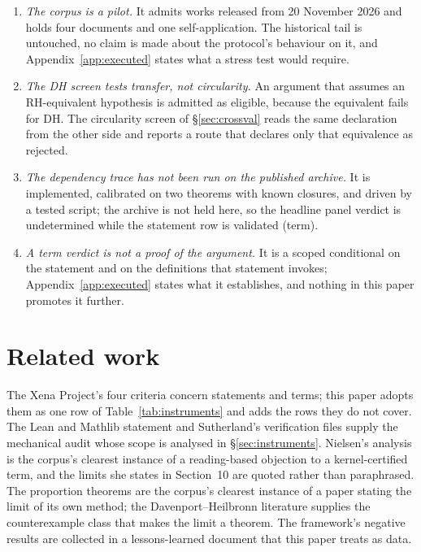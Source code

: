 \documentclass[11pt,a4paper]{article}
\newcommand{\RH}{\mathrm{RH}}
\newcommand{\DHf}{\mathrm{DH}}
\newcommand{\verdict}[1]{\textsf{#1}}
\begin{document}
\begin{enumerate}
\item \emph{The corpus is a pilot.} It admits works released from 20 November 2026 and holds four
  documents and one self-application. The historical tail is untouched, no claim is made about the
  protocol's behaviour on it, and Appendix~\ref{app:executed} states what a stress test would
  require.
\item \emph{The DH screen tests transfer, not circularity.} An argument that assumes an
  $\RH$-equivalent hypothesis is admitted as eligible, because the equivalent fails for $\DHf$. The
  circularity screen of \S\ref{sec:crossval} reads the same declaration from the other side and
  reports a route that declares only that equivalence as \verdict{rejected}.
\item \emph{The dependency trace has not been run on the published archive.} It is implemented,
  calibrated on two theorems with known closures, and driven by a tested script; the archive is not
  held here, so the headline panel verdict is \verdict{undetermined} while the statement row is
  \verdict{validated (term)}.
\item \emph{A term verdict is not a proof of the argument.} It is a scoped conditional on the
  statement and on the definitions that statement invokes; Appendix~\ref{app:executed} states what
  it establishes, and nothing in this paper promotes it further.
\end{enumerate}


\section{Related work}

The Xena Project's four criteria \cite{xena} concern statements and terms; this paper
adopts them as one row of Table~\ref{tab:instruments} and adds the rows they do not cover. The Lean
and Mathlib statement \cite{leanmathlib} and Sutherland's verification files \cite{sutherland}
supply the mechanical audit whose scope is analysed in \S\ref{sec:instruments}. Nielsen's analysis
\cite{nielsen} is the corpus's clearest instance of a reading-based objection to a kernel-certified
term, and the limits she states in Section~10 are quoted rather than paraphrased. The proportion
theorems \cite{alpogefurman,lamzouri} are the corpus's clearest instance of a paper stating the
limit of its own method; the Davenport--Heilbronn literature \cite{leclair,vorsos,franca} supplies
the counterexample class that makes the limit a theorem. The framework's negative results are
collected in a lessons-learned document that this paper treats as data.
\end{document}

